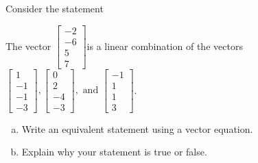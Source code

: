 
\begin{exerciseStatement}


Consider the statement 
\begin{center}\begin{minipage}{0.8\textwidth}
 The vector \( \left[\begin{array}{c}
-2 \\
-6 \\
5 \\
7
\end{array}\right] \)is a linear combination of the vectors \( \left[\begin{array}{c}
1 \\
-1 \\
-1 \\
-3
\end{array}\right] , \left[\begin{array}{c}
0 \\
2 \\
-4 \\
-3
\end{array}\right] , \text{ and } \left[\begin{array}{c}
-1 \\
1 \\
1 \\
3
\end{array}\right] \). 
\end{minipage}\end{center}
    


\begin{enumerate}[(a)]
\item  Write an equivalent statement using a vector equation.
\item  Explain why your statement is true or false.
\end{enumerate}
    
\end{exerciseStatement}
    
